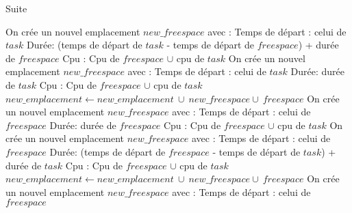\documentclass{report}
\begin{document}
\begin{algorithm}[h]
\caption{Suite}
\begin{algorithmic}[1]
	\Else
				\State On crée un nouvel emplacement $new\_freespace$ avec :
					\State \hspace{\algorithmicindent} Temps de départ : celui de $task$
					\State \hspace{\algorithmicindent} Durée: (temps de départ de $task$ - temps de départ de $freespace$) + durée de $freespace$
					\State \hspace{\algorithmicindent} Cpu : Cpu de $freespace$ $\cup$ cpu de $task$
			\Else
				\State On crée un nouvel emplacement $new\_freespace$ avec :
					\State \hspace{\algorithmicindent} Temps de départ : celui de $task$
					\State \hspace{\algorithmicindent} Durée: durée de $task$
					\State \hspace{\algorithmicindent} Cpu : Cpu de $freespace$ $\cup$ cpu de $task$
			\EndIf
			\State $new\_emplacement \gets new\_emplacement\ \cup\ new\_freespace \cup\ freespace$
				\State On crée un nouvel emplacement $new\_freespace$ avec :
					\State \hspace{\algorithmicindent} Temps de départ : celui de $freespace$
					\State \hspace{\algorithmicindent} Durée: durée de $freespace$
					\State \hspace{\algorithmicindent} Cpu : Cpu de $freespace$ $\cup$ cpu de $task$
			\Else
				\State On crée un nouvel emplacement $new\_freespace$ avec :
					\State \hspace{\algorithmicindent} Temps de départ : celui de $freespace$
					\State \hspace{\algorithmicindent} Durée: (temps de départ de $freespace$ - temps de départ de $task$) + durée de $task$
					\State \hspace{\algorithmicindent} Cpu : Cpu de $freespace$ $\cup$ cpu de $task$
			\EndIf
			\State $new\_emplacement \gets new\_emplacement\ \cup\ new\_freespace \cup\ freespace$
		\Else
				\State On crée un nouvel emplacement $new\_freespace$ avec :
					\State \hspace{\algorithmicindent} Temps de départ : celui de $freespace$

\end{algorithmic}
\end{algorithm}
\end{document}
